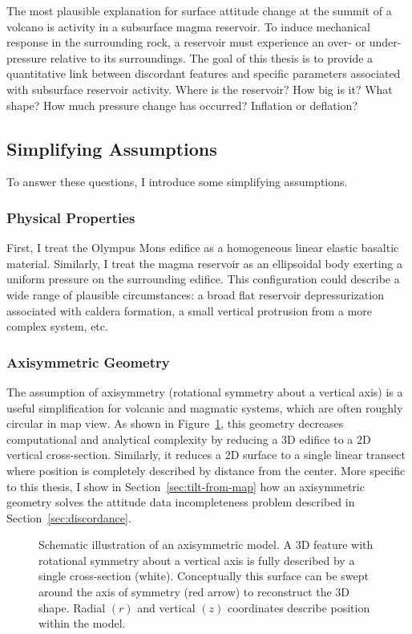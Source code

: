 The most plausible explanation for surface attitude change at the summit of a volcano is activity in a subsurface magma reservoir. To induce mechanical response in the surrounding rock, a reservoir must experience an over- or under-pressure relative to its surroundings. The goal of this thesis is to provide a quantitative link between discordant features and specific parameters associated with subsurface reservoir activity. Where is the reservoir? How big is it? What shape? How much pressure change has occurred? Inflation or deflation?   

\subsection{Simplifying Assumptions}

To answer these questions, I introduce some simplifying assumptions.

\subsubsection{Physical Properties}

First, I treat the Olympus Mons edifice as a homogeneous linear elastic basaltic material. %
Similarly, I treat the magma reservoir as an ellipsoidal body exerting a uniform pressure on the surrounding edifice. This configuration could describe a wide range of plausible circumstances: a broad flat reservoir depressurization associated with caldera formation, a small vertical protrusion from a more complex system, etc. %

\subsubsection{Axisymmetric Geometry}

The assumption of axisymmetry (rotational symmetry about a vertical axis) is a useful simplification for volcanic and magmatic systems, which are often roughly circular in map view. As shown in Figure~\ref{fig:axisymmetry}, this geometry decreases computational and analytical complexity by reducing a 3D edifice to a 2D vertical cross-section. Similarly, it reduces a 2D surface to a single linear transect where position is completely described by distance from the center. More specific to this thesis, I show in Section~\ref{sec:tilt-from-map} how an axisymmetric geometry solves the attitude data incompleteness problem described in Section~\ref{sec:discordance}.

\begin{figure}
    \caption[Axisymmetry]{Schematic illustration of an axisymmetric model. A 3D feature with rotational symmetry about a vertical axis is fully described by a single cross-section (white). Conceptually this surface can be swept around the axis of symmetry (red arrow) to reconstruct the 3D shape. Radial $(r)$ and vertical $(z)$ coordinates describe position within the model.}%
    \label{fig:axisymmetry}
\end{figure}